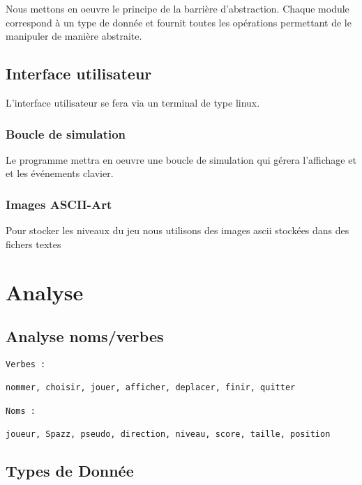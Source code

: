 \documentclass[a4paper,11pt]{article}
\begin{document}
Nous mettons en oeuvre le principe de la barrière d'abstraction. Chaque module correspond à un type de donnée et fournit toutes les opérations permettant de le manipuler de manière abstraite.

\subsection{Interface utilisateur}

L'interface utilisateur se fera via un terminal de type linux.\\

\subsubsection{Boucle de simulation}

Le programme mettra en oeuvre une boucle de simulation qui gérera l'affichage et et les événements clavier.

\subsubsection{Images ASCII-Art}

Pour stocker les niveaux du jeu nous utilisons des images ascii stockées dans des fichers textes

\newpage

\section{Analyse}

\subsection{Analyse noms/verbes}

\begin{lstlisting}
Verbes :

nommer, choisir, jouer, afficher, deplacer, finir, quitter

Noms :

joueur, Spazz, pseudo, direction, niveau, score, taille, position
\end{lstlisting}

\subsection{Types de Donnée}


\end{document}
